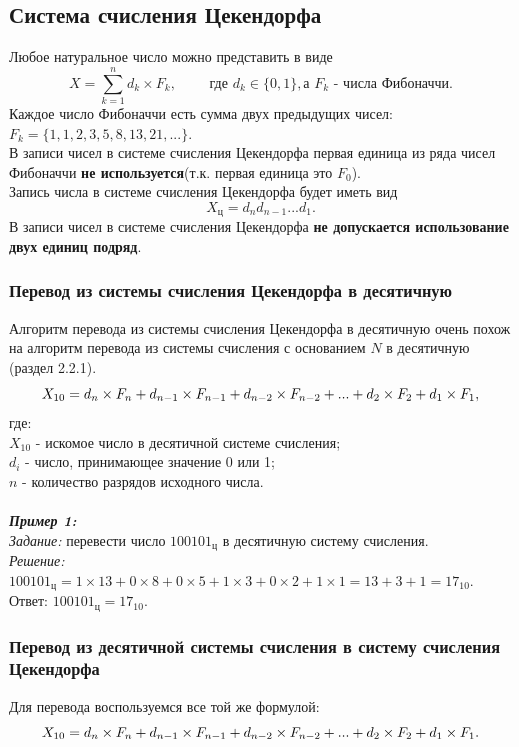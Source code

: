 \subsection{Система счисления Цекендорфа}
Любое натуральное число можно представить в виде
$$ X = \sum^{n}_{k = 1} d_{k}\times F_{k}, \qquad \mbox{ где  } d_{k} \in \{0,1\},\mbox{а } F_{k} \mbox{ - числа Фибоначчи}. $$
Каждое число Фибоначчи есть сумма двух предыдущих чисел:
\\ $F_{k} = \{1, 1, 2, 3, 5, 8, 13, 21, ...\}$.
\\В записи чисел в системе счисления Цекендорфа первая единица из ряда чисел Фибоначчи \textbf{не используется}(т.к. первая единица это $F_{0}$).
\\Запись числа в системе счисления Цекендорфа будет иметь вид $$X_{\mbox{ц}} = d_{n}d_{n-1}...d_{1}.$$
В записи чисел в системе счисления Цекендорфа \textbf{не допускается использование двух единиц подряд}.
\subsubsection{Перевод из системы счисления Цекендорфа в десятичную}
Алгоритм перевода из системы счисления Цекендорфа в десятичную очень похож на алгоритм перевода из системы счисления с основанием $N$ в десятичную (раздел 2.2.1).
$$ X_{10} = d_{n}\times F_{n} + d_{n-1}\times F_{n-1} + d_{n-2}\hm\times F_{n-2}\hm + ...\hm + d_{2}\times F_{2} + d_{1}\times F_{1},$$
где:
\\$X_{10}$ - искомое число в десятичной системе счисления;
\\$d_{i}$ - число, принимающее значение 0 или 1;
\\$n$ - количество разрядов исходного числа.
\\
\\\emph{\textbf{Пример 1:}}
\\\emph{Задание:} перевести число $100101_{\mbox{ц}}$ в десятичную систему счисления.
\\\emph{Решение:} $100101_{\mbox{ц}} = 1\times 13 + 0\times 8 + 0\times 5 + 1\times 3 + 0\times 2 + 1\times 1 = 13 + 3 + 1 = 17_{10}$.
\\Ответ:  $100101_{\mbox{ц}} = 17_{10}$.
\subsubsection{Перевод из десятичной системы счисления в систему счисления Цекендорфа}
Для перевода воспользуемся все той же формулой:
$$ X_{10} = d_{n}\times F_{n} + d_{n-1}\times F_{n-1} + d_{n-2}\hm\times F_{n-2}\hm + ...\hm + d_{2}\times F_{2} + d_{1}\times F_{1}.$$

